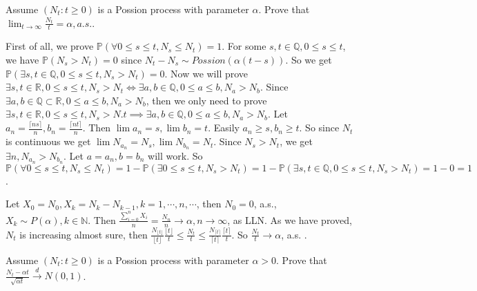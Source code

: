 \documentclass{ctexart}
\begin{document}
\begin{problem}\label{pro:2}
  Assume \((N_t:t \geq 0)\) is a Possion process with parameter \(\alpha\).
  Prove that \(\lim_{t \to \infty}\frac{N_t}{t}=\alpha,a.s.\).

\end{problem}
\begin{solution}
  First of all, we prove \(\mathbb{P}(\forall 0 \leq s \leq t, N_s \leq N_t) = 1\).
  For some \(s,t \in \mathbb{Q}, 0 \leq s \leq t\), we have \(\mathbb{P}(N_s > N_t)=0\) since \(N_t - N_s \sim Possion(\alpha(t-s))\).
  So we get \(\mathbb{P}(\exists s,t \in \mathbb{Q},0 \leq s \leq t,N_s>N_t)=0\).
  Now we will prove \(\exists s,t \in \mathbb{R},0 \leq s \leq t,N_s>N_t \iff \exists a,b \in \mathbb{Q},0 \leq a \leq b,N_a > N_b\).
  Since \(\exists a, b \in \mathbb{Q} \subset \mathbb{R}, 0 \leq a \leq b, N_a > N_b\), then
  we only need to prove \(\exists s,t \in \mathbb{R}, 0 \leq s \leq t, N_s > N.t \implies \exists a, b \in \mathbb{Q}, 0 \leq a \leq b, N_a > N_b\).
  Let \(a_n= \frac{\lceil{ns}\rceil}{n},b_n=\frac{\lceil{nt}\rceil}{n}\). Then \(\lim a_n=s,\lim b_n=t\). Easily \(a_n \geq s,b_n \geq t\).
  So since \(N_t\) is continuous we get \(\lim N_{a_n}=N_s,\lim N_{b_n}=N_t\).
  Since \(N_s>N_t\), we get \(\exists n,N_{a_n}>N_{b_n}\). Let \(a=a_n,b=b_n\) will work.
  So \(\mathbb{P}(\forall 0 \leq s \leq t,N_s \leq N_t)=1-\mathbb{P}(\exists 0 \leq s \leq t,N_s>N_t)=1-\mathbb{P}(\exists s,t \in \mathbb{Q},0 \leq s \leq t,N_s>N_t)=1-0=1\).

  Let \(X_0=N_0,X_k=N_k-N_{k-1}, k= 1,\cdots,n,\cdots\), then \(N_0=0\), a.s., \(X_k \sim P(\alpha), k \in \mathbb{N}\).
  Then \(\frac{\sum_{i=0}^{n}X_i}{n}=\frac{N_n}{n} \to \alpha, n \to \infty\), as LLN.
  As we have proved, \(N_t\) is increasing almost sure, then \(\frac{N_{\lfloor t \rfloor}}{\lfloor t\rfloor} \frac{\lfloor t \rfloor}{t} \leq \frac{N_t}{t} \leq \frac{N_{\lceil t\rceil}}{\lceil t\rceil} \frac{\lceil t\rceil}{t} \).
  So \(\frac{N_t}{t} \to \alpha\), a.s. .
\end{solution}
\begin{problem}\label{pro:3}
  Assume \((N_t:t \geq 0)\) is a Possion process with parameter \(\alpha>0\).
  Prove that \(\frac{N_t-\alpha t}{\sqrt{ \alpha t}} \overset{d}{\to} N(0,1)\).
\end{problem}
\end{document}
